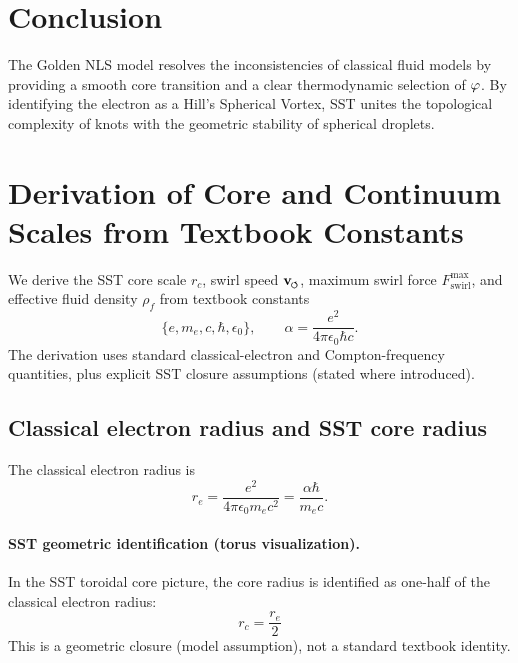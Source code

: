 \documentclass[11pt]{article}
\newcommand{\vswirl}{\mathbf{v}_{\mkern-2mu\scriptscriptstyle\boldsymbol{\circlearrowleft}}}
\newcommand{\rhoF}{\rho_{\!f}}\newcommand{\rhof}{\rho_{\!f}}     %
\newcommand{\rc}{r_c}                                    %
\begin{document}
\section{Conclusion}
The Golden NLS model resolves the inconsistencies of classical fluid models by providing a smooth core transition and a clear thermodynamic selection of $\varphi$. By identifying the electron as a Hill's Spherical Vortex, SST unites the topological complexity of knots with the geometric stability of spherical droplets.


    \providecommand{\rc}{r_c}

    \section{Derivation of Core and Continuum Scales from Textbook Constants}
    \label{sec:sst-first-principles-constants}

    We derive the SST core scale \(\rc\), swirl speed \(\vswirl\), maximum swirl force \(F_{\text{swirl}}^{\max}\), and effective fluid density \(\rhoF\) from textbook constants
    \[
        \{e,m_e,c,\hbar,\epsilon_0\},
        \qquad
        \alpha = \frac{e^2}{4\pi \epsilon_0 \hbar c}.
    \]
    The derivation uses standard classical-electron and Compton-frequency quantities, plus explicit SST closure assumptions (stated where introduced).

    \subsection{Classical electron radius and SST core radius}
        The classical electron radius is
        \begin{equation}
            r_e=\frac{e^2}{4\pi\epsilon_0 m_e c^2}
            =\frac{\alpha\hbar}{m_e c}.
            \label{eq:re-classical}
        \end{equation}

        \paragraph{SST geometric identification (torus visualization).}
            In the SST toroidal core picture, the core radius is identified as one-half of the classical electron radius:
            \begin{equation}
                \boxed{\rc=\frac{r_e}{2}}
                \label{eq:rc-from-re}
            \end{equation}
            This is a geometric closure (model assumption), not a standard textbook identity.
\end{document}
